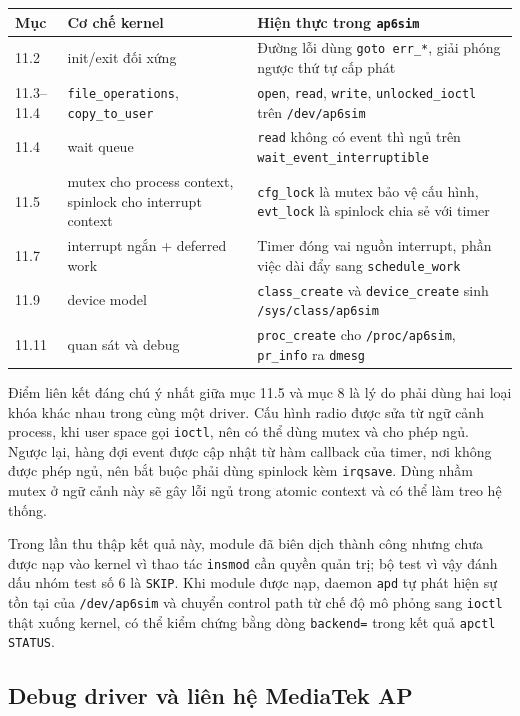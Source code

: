 \documentclass[11pt]{article}
\newcommand{\code}[1]{\texttt{#1}}
\begin{document}
\begin{center}
\begin{tabular}{lp{4.3cm}p{5.1cm}}
\toprule
\textbf{Mục} & \textbf{Cơ chế kernel} & \textbf{Hiện thực trong \code{ap6sim}} \\
\midrule
11.2 & init/exit đối xứng & Đường lỗi dùng \code{goto err\_*}, giải phóng ngược thứ tự cấp phát \\
11.3--11.4 & \code{file\_operations}, \code{copy\_to\_user} & \code{open}, \code{read}, \code{write}, \code{unlocked\_ioctl} trên \code{/dev/ap6sim} \\
11.4 & wait queue & \code{read} không có event thì ngủ trên \code{wait\_event\_interruptible} \\
11.5 & mutex cho process context, spinlock cho interrupt context & \code{cfg\_lock} là mutex bảo vệ cấu hình, \code{evt\_lock} là spinlock chia sẻ với timer \\
11.7 & interrupt ngắn + deferred work & Timer đóng vai nguồn interrupt, phần việc dài đẩy sang \code{schedule\_work} \\
11.9 & device model & \code{class\_create} và \code{device\_create} sinh \code{/sys/class/ap6sim} \\
11.11 & quan sát và debug & \code{proc\_create} cho \code{/proc/ap6sim}, \code{pr\_info} ra \code{dmesg} \\
\bottomrule
\end{tabular}
\end{center}

Điểm liên kết đáng chú ý nhất giữa mục 11.5 và mục 8 là lý do phải dùng hai loại khóa khác nhau trong cùng một driver. Cấu hình radio được sửa từ ngữ cảnh process, khi user space gọi \code{ioctl}, nên có thể dùng mutex và cho phép ngủ. Ngược lại, hàng đợi event được cập nhật từ hàm callback của timer, nơi không được phép ngủ, nên bắt buộc phải dùng spinlock kèm \code{irqsave}. Dùng nhầm mutex ở ngữ cảnh này sẽ gây lỗi ngủ trong atomic context và có thể làm treo hệ thống.

Trong lần thu thập kết quả này, module đã biên dịch thành công nhưng chưa được nạp vào kernel vì thao tác \code{insmod} cần quyền quản trị; bộ test vì vậy đánh dấu nhóm test số 6 là \code{SKIP}. Khi module được nạp, daemon \code{apd} tự phát hiện sự tồn tại của \code{/dev/ap6sim} và chuyển control path từ chế độ mô phỏng sang \code{ioctl} thật xuống kernel, có thể kiểm chứng bằng dòng \code{backend=} trong kết quả \code{apctl STATUS}.

\subsection{Debug driver và liên hệ MediaTek AP}
\end{document}
